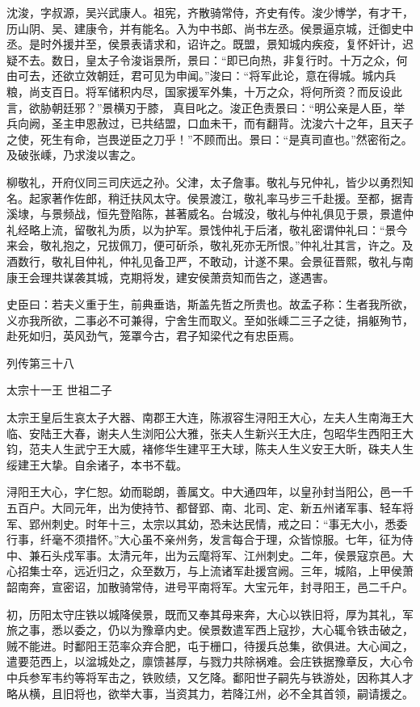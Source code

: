 \documentclass[12pt,UTF8]{ctexbook}
\begin{document}
沈浚，字叔源，吴兴武康人。祖宪，齐散骑常侍，齐史有传。浚少博学，有才干，历山阴、吴、建康令，并有能名。入为中书郎、尚书左丞。侯景逼京城，迁御史中丞。是时外援并至，侯景表请求和，诏许之。既盟，景知城内疾疫，复怀奸计，迟疑不去。数日，皇太子令浚诣景所，景曰：“即已向热，非复行时。十万之众，何由可去，还欲立效朝廷，君可见为申闻。”浚曰：“将军此论，意在得城。城内兵粮，尚支百日。将军储积内尽，国家援军外集，十万之众，将何所资？而反设此言，欲胁朝廷邪？”景横刃于膝，真目叱之。浚正色责景曰：“明公亲是人臣，举兵向阙，圣主申恩赦过，已共结盟，口血未干，而有翻背。沈浚六十之年，且天子之使，死生有命，岂畏逆臣之刀乎！”不顾而出。景曰：“是真司直也。”然密衔之。及破张嵊，乃求浚以害之。

柳敬礼，开府仪同三司庆远之孙。父津，太子詹事。敬礼与兄仲礼，皆少以勇烈知名。起家著作佐郎，稍迁扶风太守。侯景渡江，敬礼率马步三千赴援。至都，据青溪埭，与景频战，恒先登陷陈，甚著威名。台城没，敬礼与仲礼俱见于景，景遣仲礼经略上流，留敬礼为质，以为护军。景饯仲礼于后渚，敬礼密谓仲礼曰：“景今来会，敬礼抱之，兄拔佩刀，便可斫杀，敬礼死亦无所恨。”仲礼壮其言，许之。及酒数行，敬礼目仲礼，仲礼见备卫严，不敢动，计遂不果。会景征晋熙，敬礼与南康王会理共谋袭其城，克期将发，建安侯萧贲知而告之，遂遇害。

史臣曰：若夫义重于生，前典垂诰，斯盖先哲之所贵也。故孟子称：生者我所欲，义亦我所欲，二事必不可兼得，宁舍生而取义。至如张嵊二三子之徒，捐躯殉节，赴死如归，英风劲气，笼罩今古，君子知梁代之有忠臣焉。





列传第三十八

太宗十一王 世祖二子

太宗王皇后生哀太子大器、南郡王大连，陈淑容生浔阳王大心，左夫人生南海王大临、安陆王大春，谢夫人生浏阳公大雅，张夫人生新兴王大庄，包昭华生西阳王大钧，范夫人生武宁王大威，褚修华生建平王大球，陈夫人生义安王大昕，硃夫人生绥建王大挚。自余诸子，本书不载。

浔阳王大心，字仁恕。幼而聪朗，善属文。中大通四年，以皇孙封当阳公，邑一千五百户。大同元年，出为使持节、都督郢、南、北司、定、新五州诸军事、轻车将军、郢州刺史。时年十三，太宗以其幼，恐未达民情，戒之曰：“事无大小，悉委行事，纤毫不须措怀。”大心虽不亲州务，发言每合于理，众皆惊服。七年，征为侍中、兼石头戍军事。太清元年，出为云麾将军、江州刺史。二年，侯景寇京邑。大心招集士卒，远近归之，众至数万，与上流诸军赴援宫阙。三年，城陷，上甲侯萧韶南奔，宣密诏，加散骑常侍，进号平南将军。大宝元年，封寻阳王，邑二千户。

初，历阳太守庄铁以城降侯景，既而又奉其母来奔，大心以铁旧将，厚为其礼，军旅之事，悉以委之，仍以为豫章内史。侯景数遣军西上寇抄，大心辄令铁击破之，贼不能进。时鄱阳王范率众弃合肥，屯于栅口，待援兵总集，欲俱进。大心闻之，遣要范西上，以湓城处之，廪馈甚厚，与戮力共除祸难。会庄铁据豫章反，大心令中兵参军韦约等将军击之，铁败绩，又乞降。鄱阳世子嗣先与铁游处，因称其人才略从横，且旧将也，欲举大事，当资其力，若降江州，必不全其首领，嗣请援之。
\end{document}
